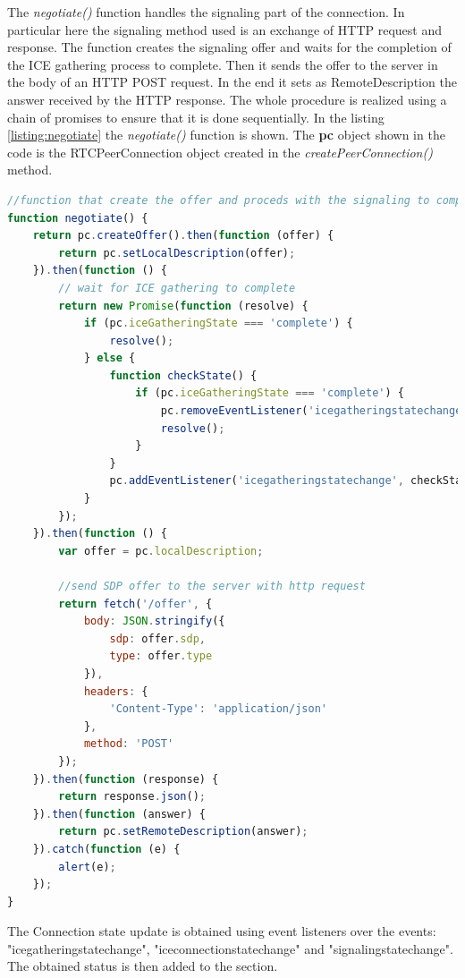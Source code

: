 \documentclass[../main.tex]{subfiles}
\begin{document}
The \textit{negotiate()} function handles the signaling part of the connection. In particular here the signaling method used is an exchange of HTTP request and response. The function creates the signaling offer and waits for the completion of the ICE gathering process to complete. Then it sends the offer to the server in the body of an HTTP POST request. In the end it sets as RemoteDescription the answer received by the HTTP response. The whole procedure is realized using a chain of promises to ensure that it is done sequentially. In the listing \ref{listing:negotiate} the \textit{negotiate()} function is shown. The \textbf{pc} object shown in the code is the RTCPeerConnection object created in the \textit{createPeerConnection()} method.

\begin{lstlisting}[language=JavaScript, caption=negotiate() function implementation]
//function that create the offer and proceds with the signaling to complete the connection
function negotiate() {
    return pc.createOffer().then(function (offer) {
        return pc.setLocalDescription(offer);
    }).then(function () {
        // wait for ICE gathering to complete
        return new Promise(function (resolve) {
            if (pc.iceGatheringState === 'complete') {
                resolve();
            } else {
                function checkState() {
                    if (pc.iceGatheringState === 'complete') {
                        pc.removeEventListener('icegatheringstatechange', checkState);
                        resolve();
                    }
                }
                pc.addEventListener('icegatheringstatechange', checkState);
            }
        });
    }).then(function () {
        var offer = pc.localDescription;

        //send SDP offer to the server with http request 
        return fetch('/offer', {
            body: JSON.stringify({
                sdp: offer.sdp,
                type: offer.type
            }),
            headers: {
                'Content-Type': 'application/json'
            },
            method: 'POST'
        });
    }).then(function (response) {
        return response.json();
    }).then(function (answer) {
        return pc.setRemoteDescription(answer);
    }).catch(function (e) {
        alert(e);
    });
}
\end{lstlisting}
\label{listing:negotiate}

The Connection state update is obtained using event listeners over the events: "icegatheringstatechange", "iceconnectionstatechange" and "signalingstatechange". The obtained status is then added to the section. 
\end{document}
